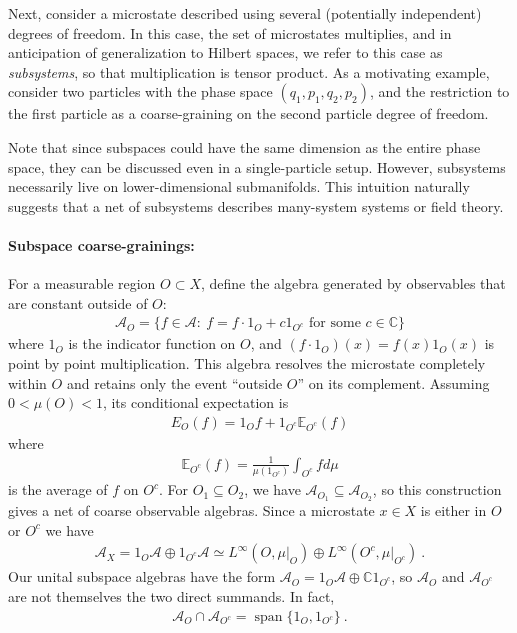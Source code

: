 \documentclass[a4paper,11pt]{article}
\theoremstyle{definition}
\newcommand{\mA}{\mathcal{A}}
\begin{document}
Next, consider a microstate described using several (potentially independent) degrees of freedom. In this case, the set of microstates multiplies, and in anticipation of generalization to Hilbert spaces, we refer to this case as {\it subsystems}, so that multiplication is tensor product. As a motivating example, consider two particles with the phase space $(q_1,p_1,q_2,p_2)$, and the restriction to the first particle as a coarse-graining on the second particle degree of freedom. 

Note that since subspaces could have the same dimension as the entire phase space, they can be discussed even in a single-particle setup. However, subsystems necessarily live on lower-dimensional submanifolds. This intuition naturally suggests that a net of subsystems describes many-system systems or field theory. 



\paragraph{Subspace coarse-grainings:}
For a measurable region $O\subset X$, define the algebra generated by observables that are constant outside of $O$:
\begin{align}
    \mA_O=\{f\in\mA:\ f=f \cdot 1_O +c 1_{O^c}\text{ for some }c\in\mathbb C\}
\end{align}
where $1_O$ is the indicator function on $O$, and $(f\cdot 1_O)(x)=f(x)1_O(x)$ is point by point multiplication.
This algebra resolves the microstate completely within $O$ and retains only the event ``outside $O$'' on its complement. Assuming $0<\mu(O)<1$, its conditional expectation is
\begin{align}
    E_O(f)=1_O f+
    1_{O^c}\mathbb{E}_{O^c}(f)
\end{align}
where 
\begin{align}
    \mathbb{E}_{O^c}(f)=\frac{1}{\mu(1_{O^c})}\int_{O^c} f d\mu
\end{align}
is the average of $f$ on $O^c$.
For $O_1\subseteq O_2$, we have $\mA_{O_1}\subseteq\mA_{O_2}$, so this construction gives a net of coarse observable algebras. Since a microstate $x\in X$ is either in $O$ or $O^c$ we have 
\begin{align}
    \mA_X=1_O\mA\oplus 1_{O^c}\mA
    \simeq L^\infty(O,\mu|_O)\oplus L^\infty(O^c,\mu|_{O^c})\ .
\end{align}
Our unital subspace algebras have the form $\mA_O=1_O\mA\oplus\mathbb C1_{O^c}$, so $\mA_O$ and $\mA_{O^c}$ are not themselves the two direct summands. In fact,
\begin{align}
    \mA_O\cap\mA_{O^c}=\operatorname{span}\{1_O,1_{O^c}\}\ .
\end{align}
\end{document}
